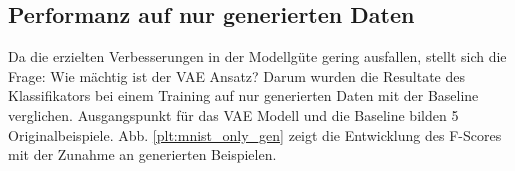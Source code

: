 \subsection{Performanz auf nur generierten Daten}\label{sec:mnist_only_gen}
Da die erzielten Verbesserungen in der Modellgüte gering ausfallen, stellt sich die Frage: Wie mächtig ist der VAE Ansatz? Darum wurden die Resultate des Klassifikators bei einem Training auf nur generierten Daten mit der Baseline verglichen. Ausgangspunkt für das VAE Modell und die Baseline bilden 5 Originalbeispiele. Abb. \ref{plt:mnist_only_gen} zeigt die Entwicklung des F-Scores mit der Zunahme an generierten Beispielen.
\begin{table}[H]
\centering
{}
\end{table}
